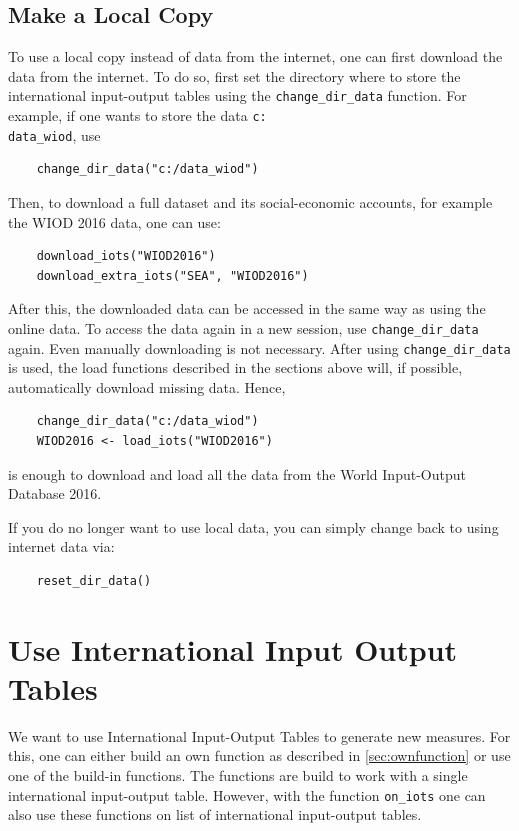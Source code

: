 \documentclass[10pt,a4paper]{paper}
\begin{document}
	\subsection{Make a Local Copy}
	To use a local copy instead of data from the internet, one can first download the data from the internet. To do so, first set the directory where to store the international input-output tables using the \texttt{change\_dir\_data} function. For example, if one wants to store the data \texttt{c:\\data\_wiod}, use
	\begin{Verbatim}
	change_dir_data("c:/data_wiod")
	\end{Verbatim}
	Then, to download a full dataset and its social-economic accounts, for example the WIOD 2016 data, one can use:
	\begin{Verbatim}
	download_iots("WIOD2016")
	download_extra_iots("SEA", "WIOD2016")
	\end{Verbatim}
	After this, the downloaded data can be accessed in the same way as using the online data. To access the data again in a new session, use \texttt{change\_dir\_data} again. Even manually downloading is not necessary. After using \texttt{change\_dir\_data} is used, the load functions described in the sections above will, if possible, automatically download missing data. Hence,
	\begin{Verbatim}
	change_dir_data("c:/data_wiod")
	WIOD2016 <- load_iots("WIOD2016")
	\end{Verbatim}
	is enough to download and load all the data from the World Input-Output Database 2016.
	
	If you do no longer want to use local data, you can simply change back to using internet data via:
	\begin{Verbatim}
	reset_dir_data()
	\end{Verbatim}
	
	\section{Use International Input Output Tables}
	We want to use International Input-Output Tables to generate new measures. For this, one can either build an own function as described in \ref{sec:ownfunction} or use one of the build-in functions. The functions are build to work with a single international input-output table. However, with the function \texttt{on\_iots} one can also use these functions on list of international input-output tables.
	
\end{document}
